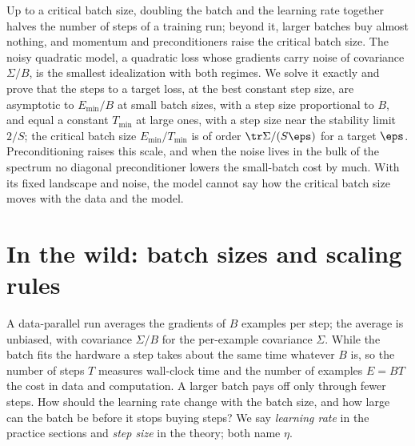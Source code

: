 \newcommand{\noiseEmin}{E_{\min}}
\newcommand{\noiseTmin}{T_{\min}}
\newcommand{\noiseBcrit}{B_{\mathrm{crit}}}
\newcommand{\noiseBnoise}{B_{\mathrm{noise}}}
\newcommand{\noiseBsimple}{B_{\mathrm{simple}}}
\newcommand{\noiseBeps}{B_{\eps}}
\newcommand{\noisesl}{\mathrm{sl}}

\begin{refsection}

\begin{chaptersummary}
Up to a critical batch size, doubling the batch and the learning rate together halves the number of steps of a training run; beyond it, larger batches buy almost nothing, and momentum and preconditioners raise the critical batch size. The noisy quadratic model, a quadratic loss whose gradients carry noise of covariance $\Sigma/B$, is the smallest idealization with both regimes. We solve it exactly and prove that the steps to a target loss, at the best constant step size, are asymptotic to $\noiseEmin/B$ at small batch sizes, with a step size proportional to $B$, and equal a constant $\noiseTmin$ at large ones, with a step size near the stability limit $2/S$; the critical batch size $\noiseEmin/\noiseTmin$ is of order $\tr\Sigma/(S\eps)$ for a target $\eps$. Preconditioning raises this scale, and when the noise lives in the bulk of the spectrum no diagonal preconditioner lowers the small-batch cost by much. With its fixed landscape and noise, the model cannot say how the critical batch size moves with the data and the model.
\end{chaptersummary}

\section{In the wild: batch sizes and scaling rules}\label{sec:noise:wild}

A data-parallel run averages the gradients of $B$ examples per step; the average is unbiased, with covariance $\Sigma/B$ for the per-example covariance $\Sigma$. While the batch fits the hardware a step takes about the same time whatever $B$ is, so the number of steps $T$ measures wall-clock time and the number of examples $E=BT$ the cost in data and computation. A larger batch pays off only through fewer steps. How should the learning rate change with the batch size, and how large can the batch be before it stops buying steps? We say \emph{learning rate} in the practice sections and \emph{step size} in the theory; both name $\eta$.


\end{refsection}
